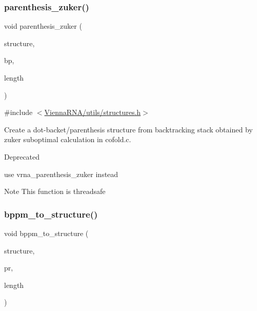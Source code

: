 \subsubsection{\texorpdfstring{parenthesis\+\_\+zuker()}{parenthesis\_zuker()}}
{\footnotesize\ttfamily void parenthesis\+\_\+zuker (\begin{DoxyParamCaption}\item[{char $\ast$}]{structure,  }\item[{\hyperlink{group__data__structures_gaa651bda42e7692f08cb603cd6834b0ee}{vrna\+\_\+bp\+\_\+stack\+\_\+t} $\ast$}]{bp,  }\item[{int}]{length }\end{DoxyParamCaption})}



{\ttfamily \#include $<$\hyperlink{utils_2structures_8h}{Vienna\+R\+N\+A/utils/structures.\+h}$>$}



Create a dot-\/backet/parenthesis structure from backtracking stack obtained by zuker suboptimal calculation in cofold.\+c. 

\begin{DoxyRefDesc}{Deprecated}
\item[\hyperlink{deprecated__deprecated000194}{Deprecated}]use vrna\+\_\+parenthesis\+\_\+zuker instead\end{DoxyRefDesc}
\begin{DoxyNote}{Note}
This function is threadsafe 
\end{DoxyNote}
\mbox{\label{group__struct__utils__deprecated_ga129d81c4a1ead793c5b2311333e03dfa}} 
\subsubsection{\texorpdfstring{bppm\+\_\+to\+\_\+structure()}{bppm\_to\_structure()}}
{\footnotesize\ttfamily void bppm\+\_\+to\+\_\+structure (\begin{DoxyParamCaption}\item[{char $\ast$}]{structure,  }\item[{\hyperlink{group__data__structures_ga31125aeace516926bf7f251f759b6126}{F\+L\+T\+\_\+\+O\+R\+\_\+\+D\+BL} $\ast$}]{pr,  }\item[{unsigned int}]{length }\end{DoxyParamCaption})}



